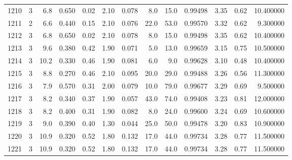 \begin{tabular}{lrrrrrrrrrrrr}
1210 &        3 &            6.8 &             0.650 &         0.02 &            2.10 &      0.078 &                  8.0 &                  15.0 &  0.99498 &  3.35 &       0.62 &  10.400000 \\
1211 &        2 &            6.6 &             0.440 &         0.15 &            2.10 &      0.076 &                 22.0 &                  53.0 &  0.99570 &  3.32 &       0.62 &   9.300000 \\
1212 &        3 &            6.8 &             0.650 &         0.02 &            2.10 &      0.078 &                  8.0 &                  15.0 &  0.99498 &  3.35 &       0.62 &  10.400000 \\
1213 &        3 &            9.6 &             0.380 &         0.42 &            1.90 &      0.071 &                  5.0 &                  13.0 &  0.99659 &  3.15 &       0.75 &  10.500000 \\
1214 &        3 &           10.2 &             0.330 &         0.46 &            1.90 &      0.081 &                  6.0 &                   9.0 &  0.99628 &  3.10 &       0.48 &  10.400000 \\
1215 &        3 &            8.8 &             0.270 &         0.46 &            2.10 &      0.095 &                 20.0 &                  29.0 &  0.99488 &  3.26 &       0.56 &  11.300000 \\
1216 &        3 &            7.9 &             0.570 &         0.31 &            2.00 &      0.079 &                 10.0 &                  79.0 &  0.99677 &  3.29 &       0.69 &   9.500000 \\
1217 &        3 &            8.2 &             0.340 &         0.37 &            1.90 &      0.057 &                 43.0 &                  74.0 &  0.99408 &  3.23 &       0.81 &  12.000000 \\
1218 &        3 &            8.2 &             0.400 &         0.31 &            1.90 &      0.082 &                  8.0 &                  24.0 &  0.99600 &  3.24 &       0.69 &  10.600000 \\
1219 &        3 &            9.0 &             0.390 &         0.40 &            1.30 &      0.044 &                 25.0 &                  50.0 &  0.99478 &  3.20 &       0.83 &  10.900000 \\
1220 &        3 &           10.9 &             0.320 &         0.52 &            1.80 &      0.132 &                 17.0 &                  44.0 &  0.99734 &  3.28 &       0.77 &  11.500000 \\
1221 &        3 &           10.9 &             0.320 &         0.52 &            1.80 &      0.132 &                 17.0 &                  44.0 &  0.99734 &  3.28 &       0.77 &  11.500000 \\

\end{tabular}
